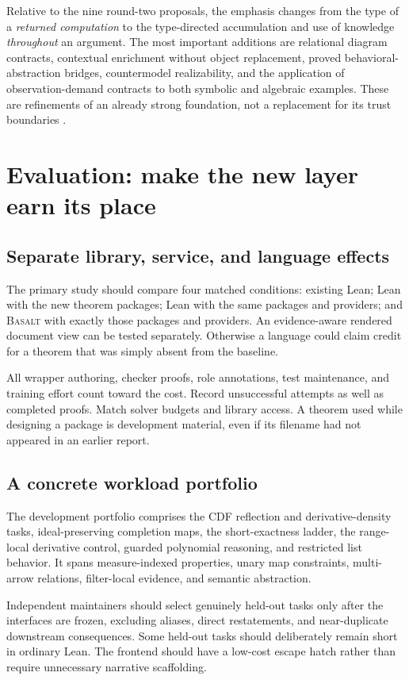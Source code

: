 \documentclass[11pt,a4paper]{article}
\newcommand{\Basalt}{\textsc{Basalt}}
\theoremstyle{plain}
\theoremstyle{definition}
\theoremstyle{remark}
\begin{document}
Relative to the nine round-two proposals, the emphasis changes from the type
of a \emph{returned computation} to the type-directed accumulation and use of
knowledge \emph{throughout} an argument. The most important additions are
relational diagram contracts, contextual enrichment without object replacement,
proved behavioral-abstraction bridges, countermodel realizability, and the
application of observation-demand contracts to both symbolic and algebraic
examples. These are refinements of an already strong foundation, not a
replacement for its trust boundaries \cite{synthesis,workbenches}.

\section{Evaluation: make the new layer earn its place}
\label{sec:evaluation}
\subsection{Separate library, service, and language effects}
The primary study should compare four matched conditions: existing Lean;
Lean with the new theorem packages; Lean with the same packages and providers;
and \Basalt{} with exactly those packages and providers. An evidence-aware
rendered document view can be tested separately. Otherwise a language could
claim credit for a theorem that was simply absent from the baseline.

All wrapper authoring, checker proofs, role annotations, test maintenance,
and training effort count toward the cost. Record unsuccessful attempts as
well as completed proofs. Match solver budgets and library access. A theorem
used while designing a package is development material, even if its filename
had not appeared in an earlier report.

\subsection{A concrete workload portfolio}
The development portfolio comprises the CDF reflection and derivative-density
tasks, ideal-preserving completion maps, the short-exactness ladder, the
range-local derivative control, guarded polynomial reasoning, and restricted
list behavior. It spans measure-indexed properties, unary map constraints,
multi-arrow relations, filter-local evidence, and semantic abstraction.

Independent maintainers should select genuinely held-out tasks only after the
interfaces are frozen, excluding aliases, direct restatements, and near-duplicate
downstream consequences. Some held-out tasks should deliberately remain short
in ordinary Lean. The frontend should have a low-cost escape hatch rather
than require unnecessary narrative scaffolding.
\end{document}
